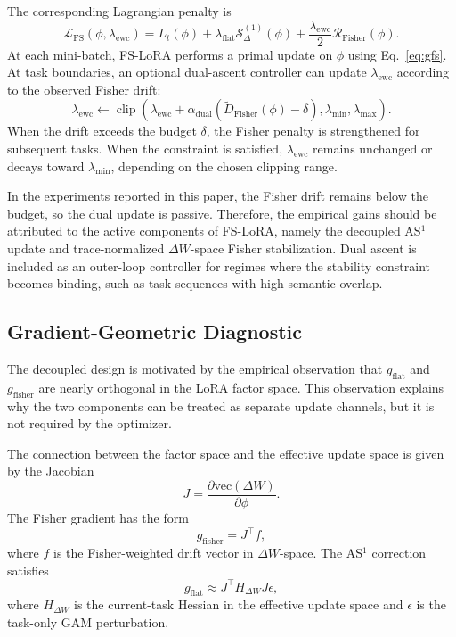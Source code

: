The corresponding Lagrangian penalty is
\begin{equation}
\mathcal L_{\mathrm{FS}}
(\phi,\lambda_{\mathrm{ewc}})
=
L_t(\phi)
+
\lambda_{\mathrm{flat}}
\mathcal S_{\Delta}^{(1)}(\phi)
+
\frac{\lambda_{\mathrm{ewc}}}{2}
\mathcal R_{\mathrm{Fisher}}(\phi).
\label{eq:fs_lagrangian}
\end{equation}
At each mini-batch, FS-LoRA performs a primal update on $\phi$ using Eq.~\eqref{eq:gfs}.
At task boundaries, an optional dual-ascent controller can update $\lambda_{\mathrm{ewc}}$ according to the observed Fisher drift:
\begin{equation}
\lambda_{\mathrm{ewc}}
\leftarrow
\operatorname{clip}
\left(
\lambda_{\mathrm{ewc}}
+
\alpha_{\mathrm{dual}}
\left(
\widetilde D_{\mathrm{Fisher}}(\phi)
-
\delta
\right),
\lambda_{\min},
\lambda_{\max}
\right).
\label{eq:dual_update}
\end{equation}
When the drift exceeds the budget $\delta$, the Fisher penalty is strengthened for subsequent tasks.
When the constraint is satisfied, $\lambda_{\mathrm{ewc}}$ remains unchanged or decays toward $\lambda_{\min}$, depending on the chosen clipping range.

In the experiments reported in this paper, the Fisher drift remains below the budget, so the dual update is passive.
Therefore, the empirical gains should be attributed to the active components of FS-LoRA, namely the decoupled AS$^1$ update and trace-normalized $\Delta W$-space Fisher stabilization.
Dual ascent is included as an outer-loop controller for regimes where the stability constraint becomes binding, such as task sequences with high semantic overlap.

\subsection{Gradient-Geometric Diagnostic}
\label{sec:gradient_diagnostic}

The decoupled design is motivated by the empirical observation that $g_{\mathrm{flat}}$ and $g_{\mathrm{fisher}}$ are nearly orthogonal in the LoRA factor space.
This observation explains why the two components can be treated as separate update channels, but it is not required by the optimizer.

The connection between the factor space and the effective update space is given by the Jacobian
\begin{equation}
J
=
\frac{
\partial \mathrm{vec}(\Delta W)
}{
\partial \phi
}.
\label{eq:lora_jacobian}
\end{equation}
The Fisher gradient has the form
\begin{equation}
g_{\mathrm{fisher}}
=
J^\top f,
\label{eq:fisher_jacobian_form}
\end{equation}
where $f$ is the Fisher-weighted drift vector in $\Delta W$-space.
The AS$^1$ correction satisfies
\begin{equation}
g_{\mathrm{flat}}
\approx
J^\top
H_{\Delta W}
J
\epsilon,
\label{eq:flat_jacobian_form}
\end{equation}
where $H_{\Delta W}$ is the current-task Hessian in the effective update space and $\epsilon$ is the task-only GAM perturbation.

